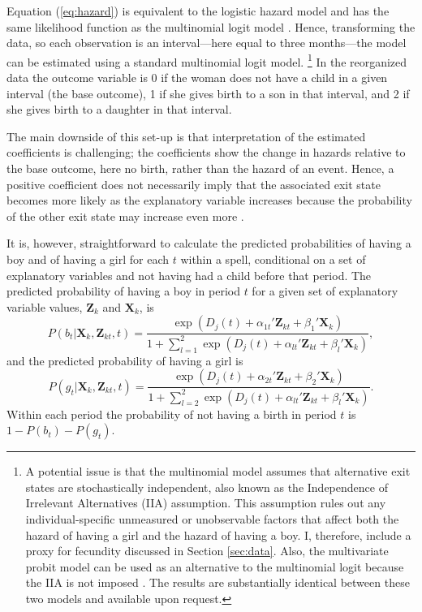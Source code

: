 \documentclass[12pt,letterpaper]{article}
\begin{document}
Equation (\ref{eq:hazard}) is equivalent to the logistic hazard model and has the same 
likelihood function as the multinomial logit model \citep{allison82,jenkins95}.
Hence, transforming the data, so each observation is an interval---here equal
to three months---the model can be estimated using a standard multinomial logit model.%
\footnote{
A potential issue is that the multinomial model assumes that alternative 
exit states are stochastically independent,
also known as the Independence of Irrelevant Alternatives (IIA) assumption.
This assumption rules out any individual-specific unmeasured or 
unobservable factors that affect both the hazard of having a girl and the 
hazard of having a boy.
I, therefore, include a proxy for fecundity discussed in Section \ref{sec:data}.
Also, the multivariate probit model can be used as an alternative
to the multinomial logit because the IIA is not imposed \citep{han90}.
The results are substantially identical between these two models and
available upon request.
}
In the reorganized data the outcome variable is 0 if the
woman does not have a child in a given interval (the base outcome), 1 if 
she gives birth to a son in that interval, and 2 if she gives birth to 
a daughter in that interval.

The main downside of this set-up is that interpretation of the estimated 
coefficients is challenging;
the coefficients show the change in hazards relative to the base outcome, 
here no birth, rather than the hazard of an event.
Hence, a positive coefficient does not necessarily imply that the associated 
exit state becomes more likely as the explanatory variable increases because the 
probability of the other exit state may increase even more \citep{thomas96}.

It is, however, straightforward to calculate the predicted probabilities of 
having a boy and of having a girl for each $t$ within a spell, conditional on 
a set of explanatory variables and not having had a child before that period.
The predicted probability of having a boy in period $t$ for a given set of 
explanatory variable values, $\mathbf{Z}_k$ and $\mathbf{X}_k$, is
\begin{equation}
P(b_{t} | \mathbf{X}_{k}, \mathbf{Z}_{kt}, t ) 
=  
\frac{ \exp(D_j(t) + \alpha_{1t}' \mathbf{Z}_{kt} + \beta_1' \mathbf{X}_{k} )}
{1 + \sum_{l=1}^2 \exp(D_j(t) + \alpha_{lt} ' \mathbf{Z}_{kt} + \beta_l ' \mathbf{X}_{k})},
\label{eq:probability_boy}
\end{equation}
and the predicted probability of having a girl is
\begin{equation}
P(g_{t} | \mathbf{X}_{k}, \mathbf{Z}_{kt},t ) 
=  
\frac{ \exp(D_j(t) + \alpha_{2t}'\mathbf{Z}_{kt} + \beta_2'\mathbf{X}_{k} )}
{1 + \sum_{l=2}^2 \exp(D_j(t) + \alpha_{lt}'\mathbf{Z}_{kt} + \beta_l'\mathbf{X}_{k})}.
\label{eq:probability_girl}
\end{equation}
Within each period the probability of not having a birth in period $t$
is $1-P(b_{t})-P(g_{t})$.
\end{document}
